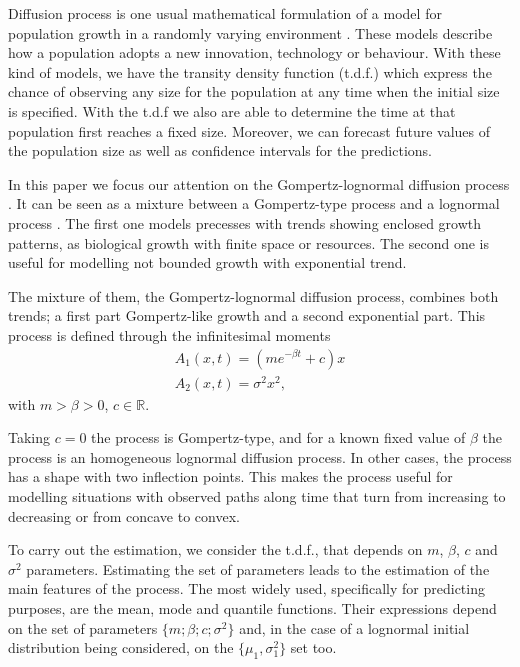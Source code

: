 \documentclass{sig-alternate}
\begin{document}

Diffusion process is one usual mathematical formulation of a model for population growth in a randomly
varying environment \cite{lognormal}. These models describe how a population adopts a new innovation, technology or behaviour. With these kind of models, we have the transity density function (t.d.f.) which express the chance of observing
any size for the population at any time when the initial size is specified. With the t.d.f we also are able to determine the time at that population first reaches a fixed size. Moreover, we can forecast future values of the population size as well as confidence intervals for the predictions.

In this paper we focus our attention on the Gompertz-lognormal diffusion process \cite{proceedingBol}. It can be seen as a mixture between a Gompertz-type process \cite{Gut07b} and a lognormal process \cite{GutCy}. The first one models precesses with trends showing enclosed growth patterns, as biological growth with finite space or resources. The second one is useful for modelling not bounded growth with exponential trend.

The mixture of them, the Gompertz-lognormal diffusion process, combines both trends; a first part Gompertz-like growth and a second exponential part. This process is defined through the infinitesimal moments
\[
\begin{array}{l}
A_1(x,t)=(m e^{-\beta t}+c)x \\
A_2(x,t)=\sigma^2 x^2,
\end{array}
\]
with $m > \beta > 0$, $c\in \mathbb{R}$.

Taking $c=0$ the process is Gompertz-type, and for a known fixed value of $\beta$ the process is an homogeneous lognormal diffusion process. In other cases, the process has a shape with two inflection points. This makes the process useful for modelling situations with observed paths along time that turn from increasing to decreasing or from concave to convex.

To carry out the estimation, we consider the t.d.f., that depends on $m$, $\beta$, $c$ and $\sigma^2$ parameters. Estimating the set of parameters leads to the estimation of the main features of the process. The most widely used, specifically for predicting purposes, are the mean, mode and quantile functions. Their expressions depend on the set of parameters $\{m;\beta; c; \sigma^2\}$ and, in the case of a lognormal initial distribution being considered, on the $\{ \mu_1, \sigma_1^2 \}$ set too.
\end{document}
